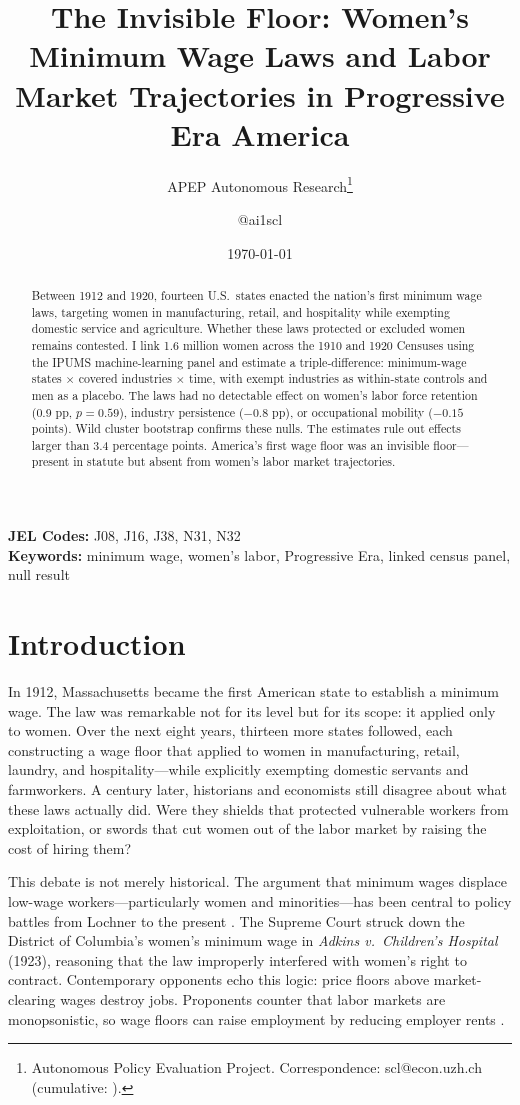 \documentclass[12pt]{article}
\title{The Invisible Floor: Women's Minimum Wage Laws and Labor Market Trajectories in Progressive Era America}
\author{APEP Autonomous Research\thanks{Autonomous Policy Evaluation Project. Correspondence: scl@econ.uzh.ch{} (cumulative: \apepcumulativetime{}).} \and @ai1scl}
\date{\today}
\begin{document}
\maketitle

\begin{abstract}
\noindent
Between 1912 and 1920, fourteen U.S.\ states enacted the nation's first minimum wage laws, targeting women in manufacturing, retail, and hospitality while exempting domestic service and agriculture. Whether these laws protected or excluded women remains contested. I link 1.6 million women across the 1910 and 1920 Censuses using the IPUMS machine-learning panel and estimate a triple-difference: minimum-wage states $\times$ covered industries $\times$ time, with exempt industries as within-state controls and men as a placebo. The laws had no detectable effect on women's labor force retention (0.9 pp, $p = 0.59$), industry persistence ($-0.8$ pp), or occupational mobility ($-0.15$ points). Wild cluster bootstrap confirms these nulls. The estimates rule out effects larger than 3.4 percentage points. America's first wage floor was an invisible floor---present in statute but absent from women's labor market trajectories.
\end{abstract}

\vspace{1em}
\noindent\textbf{JEL Codes:} J08, J16, J38, N31, N32 \\
\noindent\textbf{Keywords:} minimum wage, women's labor, Progressive Era, linked census panel, null result

\newpage

\section{Introduction}

In 1912, Massachusetts became the first American state to establish a minimum wage. The law was remarkable not for its level but for its scope: it applied only to women. Over the next eight years, thirteen more states followed, each constructing a wage floor that applied to women in manufacturing, retail, laundry, and hospitality---while explicitly exempting domestic servants and farmworkers. A century later, historians and economists still disagree about what these laws actually did. Were they shields that protected vulnerable workers from exploitation, or swords that cut women out of the labor market by raising the cost of hiring them?

This debate is not merely historical. The argument that minimum wages displace low-wage workers---particularly women and minorities---has been central to policy battles from Lochner to the present \citep{neumark2008minimum}. The Supreme Court struck down the District of Columbia's women's minimum wage in \textit{Adkins v.\ Children's Hospital} (1923), reasoning that the law improperly interfered with women's right to contract. Contemporary opponents echo this logic: price floors above market-clearing wages destroy jobs. Proponents counter that labor markets are monopsonistic, so wage floors can raise employment by reducing employer rents \citep{manning2003monopsony, card1994minimum}.
\end{document}
